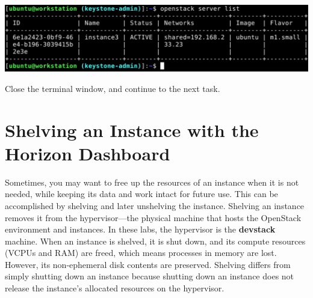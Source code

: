 \documentclass[letterpaper, 12pt]{article}
\begin{document}
\begin{enumerate}
\begin{labstep}
        \begin{center}
            \includegraphics[width=\linewidth]{images/part4/step20.png}
        \end{center}
    \end{labstep}

    \begin{labstep}
        Close the terminal window, and continue to the next task.
    \end{labstep}

\end{enumerate}

\section{Shelving an Instance with the Horizon Dashboard}\label{sec:shelving_an_instance_with_the_horizon_dashboard}
Sometimes, you may want to free up the resources of an instance when it is not needed, while keeping its data and work intact for future use.
This can be accomplished by shelving and later unshelving the instance.
Shelving an instance removes it from the hypervisor---the physical machine that hosts the OpenStack environment and instances.
In these labs, the hypervisor is the \textbf{devstack} machine.
When an instance is shelved, it is shut down, and its compute resources (VCPUs and RAM) are freed, which means processes in memory are lost.
However, its non-ephemeral disk contents are preserved.
Shelving differs from simply shutting down an instance because shutting down an instance does not release the instance's allocated resources on the hypervisor.
\end{document}
